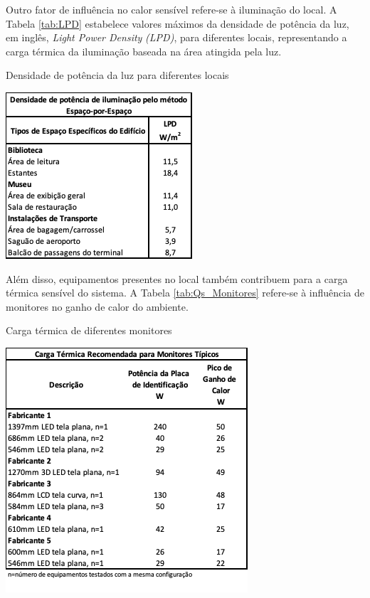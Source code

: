 \documentclass[acronym,symbols,table]{fei}
\begin{document}
Outro fator de influência no calor sensível refere-se à iluminação do local. A Tabela \ref{tab:LPD} estabelece valores máximos da densidade de potência da luz, em inglês, \textit{Light Power Density} \textit{(LPD)}, para diferentes locais, representando a carga térmica da iluminação baseada na área atingida pela luz.

\begin{table}[!htb] 
 \centering
    \caption{Densidade de potência da luz para diferentes locais}
    \includegraphics[width=0.5\linewidth]{Tabelas/LPD.png}
    \label{tab:LPD}
\end{table}

\newpage

Além disso, equipamentos presentes no local também contribuem para a carga térmica sensível do sistema. A Tabela \ref{tab:Qs_Monitores} refere-se à influência de monitores no ganho de calor do ambiente.

\begin{table}[!htb] 
 \centering
    \caption{Carga térmica de diferentes monitores}
    \includegraphics[width=0.5\linewidth]{Tabelas/Qs_Monitores.png}
    \label{tab:Qs_Monitores}
\end{table}
\end{document}
